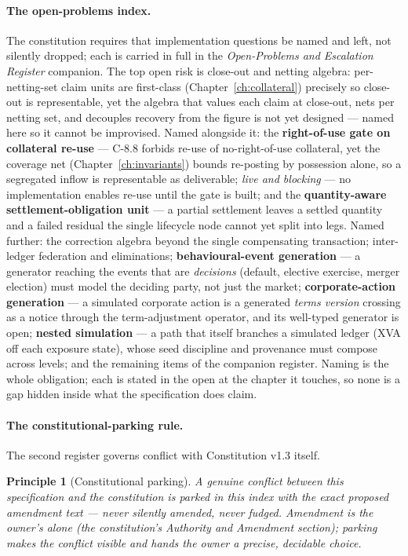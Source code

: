 \documentclass[11pt,a4paper]{article}
\newtheorem{principle}[definition]{Principle}
\begin{document}
\paragraph{The open-problems index.} The constitution requires that implementation
questions be named and left, not silently dropped; each is carried in full in the
\emph{Open-Problems and Escalation Register} companion. The top open risk is close-out and
netting algebra: per-netting-set claim units are first-class
(Chapter~\ref{ch:collateral}) precisely so close-out is representable, yet the algebra
that values each claim at close-out, nets per netting set, and decouples recovery from the
figure is not yet designed --- named here so it cannot be improvised. Named alongside it: the \textbf{right-of-use gate on collateral re-use} --- C-8.8 forbids
re-use of no-right-of-use collateral, yet the coverage net
(Chapter~\ref{ch:invariants}) bounds re-posting by possession alone, so a segregated
inflow is representable as deliverable; \emph{live and blocking} --- no implementation
enables re-use until the gate is built; and the \textbf{quantity-aware
settlement-obligation unit} --- a partial settlement leaves a settled quantity and a failed
residual the single lifecycle node cannot yet split into legs. Named further: the correction
algebra beyond the single compensating transaction; inter-ledger federation and
eliminations; \textbf{behavioural-event generation} --- a generator reaching the events
that are \emph{decisions} (default, elective exercise, merger election) must model the
deciding party, not just the market; \textbf{corporate-action generation} --- a simulated
corporate action is a generated \emph{terms version} crossing as a notice through the
term-adjustment operator, and its well-typed generator is open; \textbf{nested simulation}
--- a path that itself branches a simulated ledger (XVA off each exposure state), whose
seed discipline and provenance must compose across levels; and the remaining items of the
companion register. Naming
is the whole obligation; each is stated in the open at the chapter it touches, so none is a
gap hidden inside what the specification does claim.

\paragraph{The constitutional-parking rule.} The second register governs conflict with
Constitution v1.3 itself.

\begin{principle}[Constitutional parking]
A genuine conflict between this specification and the constitution is parked in this index
with the exact proposed amendment text --- never silently amended, never fudged. Amendment
is the owner's alone (the constitution's \emph{Authority and Amendment} section); parking
makes the conflict visible and hands the owner a precise, decidable choice.
\end{principle}
\end{document}
